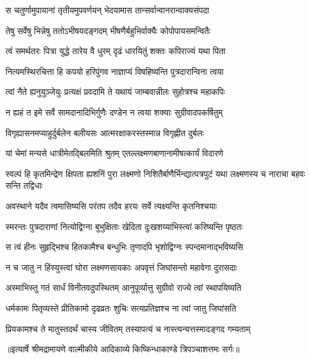 \twolineshloka
{स चतुर्णामुपायानां तृतीयमुपवर्णयन्}
{भेदयामास तान्सर्वान्वानरान्वाक्यसंपदा} %

\twolineshloka
{तेषु सर्वेषु भिन्नेषु ततोऽभीषयदङ्गदम्}
{भीषणैर्बहुभिर्वाक्यैः कोपोपायसमन्वितैः} %

\twolineshloka
{त्वं समर्थतरः पित्रा युद्धे तारेय वै धुरम्}
{दृढं धारयितुं शक्तः कपिराज्यं यथा पिता} %

\twolineshloka
{नित्यमस्थिरचित्ता हि कपयो हरिपुंगव}
{नाज्ञाप्यं विषहिष्यन्ति पुत्रदारान्विना त्वया} %

\twolineshloka
{त्वां नैते ह्यनुयुञ्जेयुः प्रत्यक्षं प्रवदामि ते}
{यथायं जाम्बवान्नीलः सुहोत्रश्च महाकपिः} %

\twolineshloka
{न ह्यहं त इमे सर्वे सामदानादिभिर्गुणैः}
{दण्डेन न त्वया शक्याः सुग्रीवादपकर्षितुम्} %

\twolineshloka
{विगृह्यासनमप्याहुर्दुर्बलेन बलीयसः}
{आत्मरक्षाकरस्तस्मान्न विगृह्णीत दुर्बलः} %

\twolineshloka
{यां चेमां मन्यसे धात्रीमेतद्बिलमिति श्रुतम्}
{एतल्लक्ष्मणबाणानामीषत्कार्यं विदारणे} %

\threelineshloka
{स्वल्पं हि कृतमिन्द्रेण क्षिपता ह्यशनिं पुरा}
{लक्ष्मणो निशितैर्बाणैर्भिन्द्यात्पत्रपुटं यथा}
{लक्ष्मणस्य च नाराचा बहवः सन्ति तद्विधाः} %

\twolineshloka
{अवस्थाने यदैव त्वमासिष्यसि परंतप}
{तदैव हरयः सर्वे त्यक्ष्यन्ति कृतनिश्चयाः} %

\twolineshloka
{स्मरन्तः पुत्रदाराणां नित्योद्विग्ना बुभुक्षिताः}
{खेदिता दुःखशय्याभिस्त्वां करिष्यन्ति पृष्ठतः} %

\twolineshloka
{स त्वं हीनः सुहृद्भिश्च हितकामैश्च बन्धुभिः}
{तृणादपि भृशोद्विग्नः स्पन्दमानाद्भविष्यसि} %

\twolineshloka
{न च जातु न हिंस्युस्त्वां घोरा लक्ष्मणसायकाः}
{अपवृत्तं जिघांसन्तो महावेगा दुरासदाः} %

\twolineshloka
{अस्माभिस्तु गतं सार्धं विनीतवदुपस्थितम्}
{आनुपूर्व्यात्तु सुग्रीवो राज्ये त्वां स्थापयिष्यति} %

\twolineshloka
{धर्मकामः पितृव्यस्ते प्रीतिकामो दृढव्रतः}
{शुचिः सत्यप्रतिज्ञश्च ना त्वां जातु जिघांसति} %

\twolineshloka
{प्रियकामश्च ते मातुस्तदर्थं चास्य जीवितम्}
{तस्यापत्यं च नास्त्यन्यत्तस्मादङ्गद गम्यताम्} %


{॥इत्यार्षे श्रीमद्रामायणे वाल्मीकीये आदिकाव्ये किष्किन्धाकाण्डे त्रिपञ्चाशत्तमः सर्गः॥}

